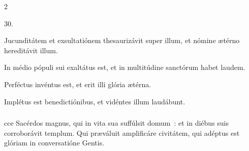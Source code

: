 \documentclass[9pt,twoside]{extarticle}
\begin{document}
\begin{multicols}{2}
{\begin{tightlist}{}
\item {} 30.
\item {} Jucunditátem et exsultatiónem thesaurizávit super illum, et nómine ætérno hereditávit illum.
\item {} In médio pópuli sui exaltátus est, et in multitúdine sanctórum habet laudem.
\item {} Perféctus invéntus est, et erit illi glória ætérna.
\item {} Implétus est benedictiónibus, et vidéntes illum laudábunt.
\end{tightlist}

\subsubsection*{}
cce Sacérdos magnus, qui in vita sua suffúlsit domum~: et in diébus suis corroborávit templum. Qui præváluit amplificáre civitátem, qui adéptus est glóriam in conversatióne Gentis.

}
\end{multicols}
\end{document}
